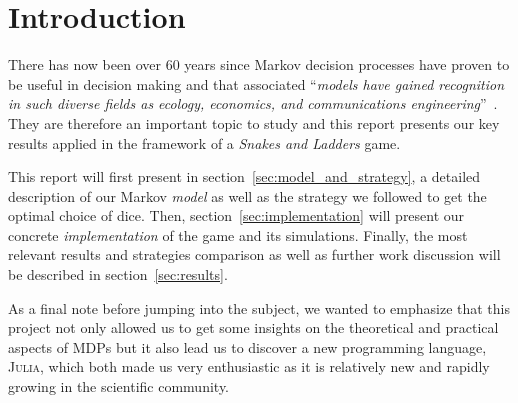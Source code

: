 \section{Introduction} %
\label{sec:introduction}
There has now been over 60 years since Markov decision processes have proven to
be useful in decision making and that associated \enquote{\textit{models have 
gained recognition in such diverse fields as ecology, economics,
and communications engineering}}~\cite{puterman2014markov}.
They are therefore an important topic to study and this report presents
our key results applied in the framework of a \emph{Snakes and Ladders} game.

This report will first present in section~\ref{sec:model_and_strategy},
a detailed description of our Markov \emph{model}
as well as the strategy we followed to get the optimal choice of dice.
Then, section~\ref{sec:implementation} will present our concrete \emph{implementation}
of the game and its simulations.
Finally, the most relevant results and strategies comparison as well as
further work discussion will be described in section~\ref{sec:results}.

As a final note before jumping into the subject, we wanted to
emphasize that this project not only allowed us to get some
insights on the theoretical and practical aspects of MDPs
but it also lead us to discover a new programming language, \textsc{Julia},
which both made us very enthusiastic as it is relatively new
and rapidly growing in the scientific community.

